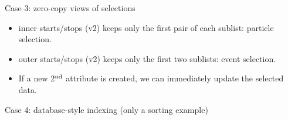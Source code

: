 \documentclass[aspectratio=169]{beamer}
\begin{document}
\begin{frame}{Case 3: zero-copy views of selections}
\vspace{0.25 cm}
\begin{itemize}
\item inner starts/stops (v2) keeps only the first pair of each sublist: particle selection.
\item outer starts/stops (v2) keeps only the first two sublists: event selection.
\item<2-> If a new 2$^{\mbox{\scriptsize nd}}$ attribute is created, we can immediately update the selected data.
\end{itemize}
\end{frame}

\begin{frame}{Case 4: database-style indexing (only a sorting example)}
\vspace{0.5 cm}


\end{frame}
\end{document}
